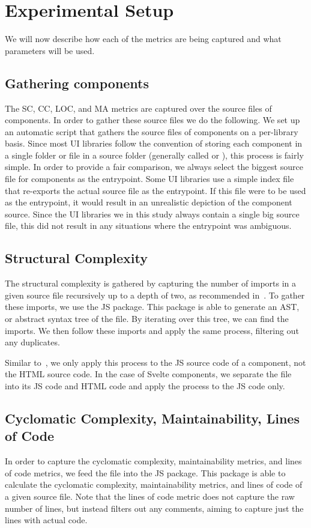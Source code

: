\chapter{Experimental Setup}
We will now describe how each of the metrics are being captured and what parameters will be used.

\section{Gathering components}\label{sec:experimental-setup:gathering-components}
The SC, CC, LOC, and MA metrics are captured over the source files of components. In order to gather these source files we do the following. We set up an automatic script that gathers the source files of components on a per-library basis. Since most UI libraries follow the convention of storing each component in a single folder or file in a source folder (generally called  or ), this process is fairly simple. In order to provide a fair comparison, we always select the biggest source file for components as the entrypoint. Some UI libraries use a simple index file that re-exports the actual source file as the entrypoint. If this file were to be used as the entrypoint, it would result in an unrealistic depiction of the component source. Since the UI libraries we in this study always contain a single big source file, this did not result in any situations where the entrypoint was ambiguous.

\section{Structural Complexity}
The structural complexity is gathered by capturing the number of imports in a given source file recursively up to a depth of two, as recommended in~\cite{martinez-ortiz2016quality}. To gather these imports, we use the  JS package. This package is able to generate an AST, or abstract syntax tree of the file. By iterating over this tree, we can find the imports. We then follow these imports and apply the same process, filtering out any duplicates.

Similar to~\cite{martinez-ortiz2016quality}, we only apply this process to the JS source code of a component, not the HTML source code. In the case of Svelte components, we separate the file into its JS code and HTML code and apply the process to the JS code only.

\section{Cyclomatic Complexity, Maintainability, Lines of Code}
In order to capture the cyclomatic complexity, maintainability metrics, and lines of code metrics, we feed the file into the  JS package. This package is able to calculate the cyclomatic complexity, maintainability metrics, and lines of code of a given source file. Note that the lines of code metric does not capture the raw number of lines, but instead filters out any comments, aiming to capture just the lines with actual code.

